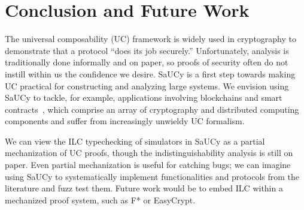\section{Conclusion and Future Work}
\label{sec:conclusion}

The universal composability (UC) framework is widely used in cryptography to
demonstrate that a protocol ``does its job securely.'' Unfortunately, analysis
is traditionally done informally and on paper, so proofs of security often do
not instill within us the confidence we desire.
SaUCy is a first step towards making UC practical for constructing
and analyzing large systems.
%
%
We envision using SaUCy to tackle, for example, applications involving blockchains and smart contracts~\cite{dziembowski2018general,miller2017sprites,dziembowski2017perun}, which comprise an array of cryptography and distributed computing components and suffer from increasingly unwieldy UC formalism.

We can view the ILC typechecking of simulators in SaUCy as a partial
mechanization of UC proofs, though the indistinguishability analysis
is still on paper.
Even partial mechanization is useful for catching
bugs; we can imagine using SaUCy to systematically implement
functionalities and protocols from the literature and fuzz test
them.
Future work would be to embed ILC within a mechanized proof system,
such as F* or EasyCrypt.

